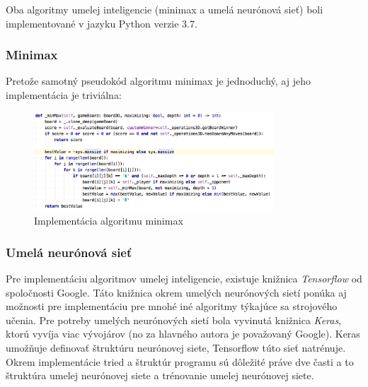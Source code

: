 Oba algoritmy umelej inteligencie (minimax a umelá neurónová sieť) boli implementované v jazyku Python verzie 3.7.

\subsubsection{Minimax}

Pretože samotný pseudokód algoritmu minimax je jednoduchý, aj jeho implementácia je triviálna:
\begin{figure}[H]
    \centering
    \includegraphics[width=0.8\textwidth]{images/impl-minimax.jpg}
    \caption{Implementácia algoritmu minimax}
\end{figure}\label{figure:minimax-impl}

\subsubsection{Umelá neurónová sieť}

Pre implementáciu algoritmov umelej inteligencie, existuje knižnica \emph{Tensorflow}\cite{tensorflow} od spoločnosti
Google.
Táto knižnica okrem umelých neurónových sietí ponúka aj možnosti pre implementáciu pre mnohé iné algoritmy týkajúce sa
strojového učenia.
Pre potreby umelých neurónových sietí bola vyvinutá knižnica \emph{Keras}\cite{keras}, ktorú vyvíja viac vývojárov
(no za hlavného autora je považovaný Google).
Keras umožňuje definovať štruktúru neurónovej siete, Tensorflow túto sieť natrénuje.
Okrem implementácie tried a štruktúr programu sú dôležité práve dve časti a to štruktúra umelej neurónovej siete a
trénovanie umelej neurónovej siete.

